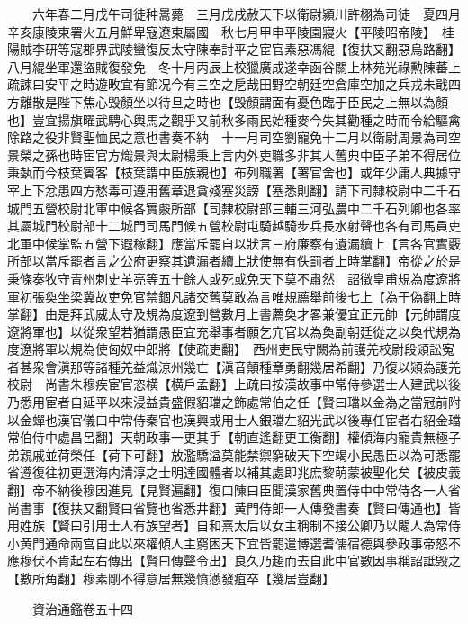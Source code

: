 　　六年春二月戊午司徒种暠薨　三月戊戌赦天下以衛尉潁川許栩為司徒　夏四月辛亥康陵東署火五月鮮卑寇遼東屬國　秋七月甲申平陵園寢火【平陵昭帝陵】　桂陽賊李研等寇郡界武陵蠻復反太守陳奉討平之宦官素惡馮緄【復扶又翻惡烏路翻】八月緄坐軍還盜賊復發免　冬十月丙辰上校獵廣成遂幸函谷關上林苑光祿勲陳蕃上疏諫曰安平之時遊畋宜有節况今有三空之戹哉田野空朝廷空倉庫空加之兵戎未戢四方離散是陛下焦心毁顏坐以待旦之時也【毁顏謂面有憂色臨于臣民之上無以為顏也】豈宜揚旗曜武騁心輿馬之觀乎又前秋多雨民始種麥今失其勸種之時而令給驅禽除路之役非賢聖恤民之意也書奏不納　十一月司空劉寵免十二月以衛尉周景為司空景榮之孫也時宦官方熾景與太尉楊秉上言内外吏職多非其人舊典中臣子弟不得居位秉埶而今枝葉賓客【枝葉謂中臣族親也】布列職署【署官舍也】或年少庸人典據守宰上下忿患四方愁毒可遵用舊章退貪殘塞災謗【塞悉則翻】請下司隸校尉中二千石城門五營校尉北軍中候各實覈所部【司隸校尉部三輔三河弘農中二千石列卿也各率其屬城門校尉部十二城門司馬門候五營校尉屯騎越騎步兵長水射聲也各有司馬員吏北軍中候掌監五營下遐稼翻】應當斥罷自以狀言三府廉察有遺漏續上【言各官實覈所部以當斥罷者言之公府更察其遺漏者續上狀使無有佚罰者上時掌翻】帝從之於是秉條奏牧守青州刺史羊亮等五十餘人或死或免天下莫不肅然　詔徵皇甫規為度遼將軍初張奐坐梁冀故吏免官禁錮凡諸交舊莫敢為言唯規薦舉前後七上【為于偽翻上時掌翻】由是拜武威太守及規為度遼到營數月上書薦奐才畧兼優宜正元帥【元帥謂度遼將軍也】以從衆望若猶謂愚臣宜充舉事者願乞宂官以為奐副朝廷從之以奐代規為度遼將軍以規為使匈奴中郎將【使疏吏翻】　西州吏民守闕為前護羌校尉段熲訟寃者甚衆會滇那等諸種羌益熾涼州幾亡【滇音顛種章勇翻幾居希翻】乃復以熲為護羌校尉　尚書朱穆疾宦官恣横【横戶孟翻】上疏曰按漢故事中常侍參選士人建武以後乃悉用宦者自延平以來浸益貴盛假貂璫之飾處常伯之任【賢曰璫以金為之當冠前附以金蟬也漢官儀曰中常侍秦官也漢興或用士人銀璫左貂光武以後專任宦者右貂金璫常伯侍中處昌呂翻】天朝政事一更其手【朝直遙翻更工衡翻】權傾海内寵貴無極子弟親戚並荷榮任【荷下可翻】放濫驕溢莫能禁禦窮破天下空竭小民愚臣以為可悉罷省遵復往初更選海内清淳之士明達國體者以補其處即兆庶黎萌蒙被聖化矣【被皮義翻】帝不納後穆因進見【見賢遍翻】復口陳曰臣聞漢家舊典置侍中中常侍各一人省尚書事【復扶又翻賢曰省覽也省悉井翻】黄門侍郎一人傳發書奏【賢曰傳通也】皆用姓族【賢曰引用士人有族望者】自和熹太后以女主稱制不接公卿乃以閹人為常侍小黄門通命兩宫自此以來權傾人主窮困天下宜皆罷遣博選耆儒宿德與參政事帝怒不應穆伏不肯起左右傳出【賢曰傳聲令出】良久乃趨而去自此中官數因事稱詔詆毁之【數所角翻】穆素剛不得意居無幾憤懣發疽卒【幾居豈翻】

　　資治通鑑卷五十四


    


 


